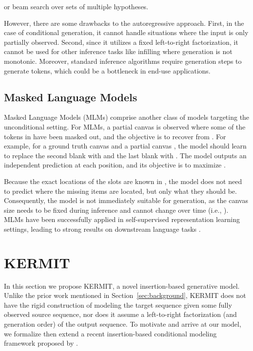 \documentclass{article}
\begin{document}
or beam search over sets of multiple hypotheses.

However, there are some drawbacks to the autoregressive approach. First, in the case of conditional generation, it cannot handle situations where the input  is only partially observed. Second, since it utilizes a fixed left-to-right factorization, it cannot be used for other inference tasks like infilling where generation is not monotonic. Moreover, standard inference algorithms require  generation steps to generate  tokens, which could be a bottleneck in end-use applications.

\subsection{Masked Language Models}
Masked Language Models (MLMs) \citep{devlin-naacl-2019} comprise another class of models targeting the unconditional setting. For MLMs, a partial canvas  is observed where some of the tokens in  have been masked out, and the objective is to recover  from .
For example, for a ground truth canvas  and a partial canvas , the model should learn to replace the second blank with  and the last blank with .
The model outputs an independent prediction at each position, and its objective is to maximize .




Because the exact locations of the slots are known in , the model does not need to predict where the missing items are located, but only what they should be.
Consequently, the model is not immediately suitable for generation, as the canvas size needs to be fixed during inference and cannot change over time (i.e., ). MLMs have been successfully applied in self-supervised representation learning settings, leading to strong results on downstream language tasks \citep{devlin-naacl-2019}.









%
 \section{KERMIT}
\label{sec:kermit}

In this section we propose KERMIT, a novel insertion-based generative model. Unlike the prior work mentioned in Section~\ref{sec:background}, KERMIT does not have the rigid construction of modeling the target sequence given some fully observed source sequence, nor does it assume a left-to-right factorization (and generation order) of the output sequence. To motivate and arrive at our model, we formalize then extend a recent insertion-based conditional modeling framework proposed by \citet{stern-icml-2019}.
\end{document}
